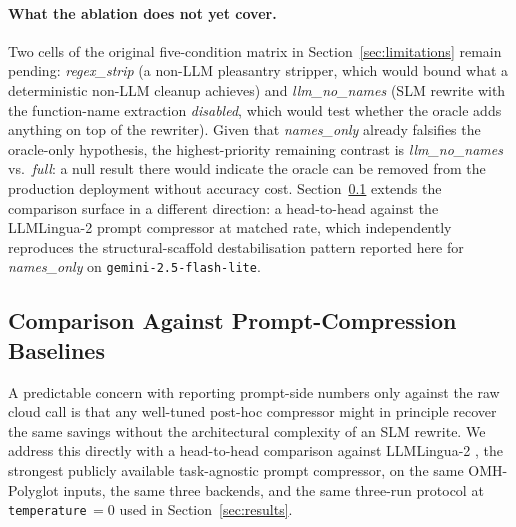 \documentclass[11pt,a4paper,twocolumn]{article}
\begin{document}
\paragraph{What the ablation does not yet cover.} Two cells of the original five-condition matrix in Section~\ref{sec:limitations} remain pending: \textit{regex\_strip} (a non-LLM pleasantry stripper, which would bound what a deterministic non-LLM cleanup achieves) and \textit{llm\_no\_names} (SLM rewrite with the function-name extraction \emph{disabled}, which would test whether the oracle adds anything on top of the rewriter). Given that \textit{names\_only} already falsifies the oracle-only hypothesis, the highest-priority remaining contrast is \textit{llm\_no\_names} vs.\ \textit{full}: a null result there would indicate the oracle can be removed from the production deployment without accuracy cost. Section~\ref{sec:baselines} extends the comparison surface in a different direction: a head-to-head against the LLMLingua-2 \cite{pan2024llmlingua2} prompt compressor at matched rate, which independently reproduces the structural-scaffold destabilisation pattern reported here for \textit{names\_only} on \texttt{gemini-2.5-flash-lite}.

\subsection{Comparison Against Prompt-Compression Baselines}
\label{sec:baselines}

A predictable concern with reporting prompt-side numbers only against the raw cloud call is that any well-tuned post-hoc compressor might in principle recover the same savings without the architectural complexity of an SLM rewrite. We address this directly with a head-to-head comparison against LLMLingua-2 \cite{pan2024llmlingua2}, the strongest publicly available task-agnostic prompt compressor, on the same OMH-Polyglot inputs, the same three backends, and the same three-run protocol at \texttt{temperature}\,$=0$ used in Section~\ref{sec:results}.
\end{document}
